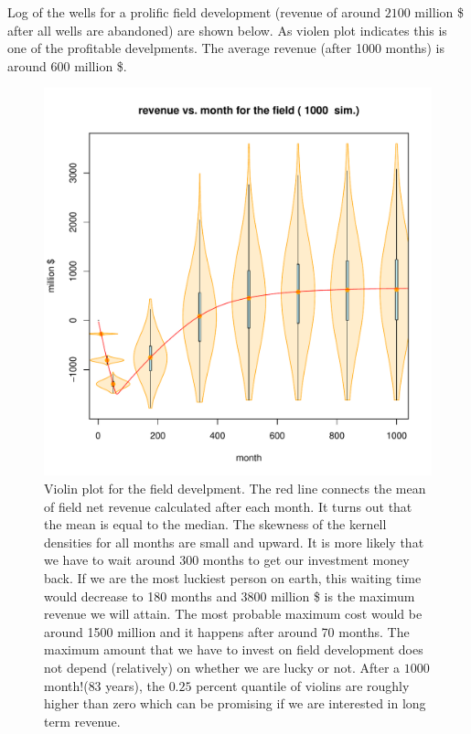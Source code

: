\documentclass[paper=a4, fontsize=12pt]{scrartcl}\usepackage{graphicx, color}
\numberwithin{equation}{section} %
\numberwithin{figure}{section} %
\numberwithin{table}{section} %
\begin{document}
Log of the wells for a prolific field development (revenue of around $2100$ million \$ after all wells are abandoned) are shown below. As violen plot indicates this is one of the profitable develpments. The average revenue (after 1000 months) is around 600 million \$. 

%

\pagebreak


\begin{figure}[htbp]
\begin{center}
\includegraphics[width=\linewidth]{vioplot.pdf}
\caption{Violin plot for the field develpment. The red line connects the mean of field net revenue calculated after each month. It turns out that the mean is equal to the median. The skewness of the kernell densities for all months are small and upward. It is more likely that we have to wait around 300 months to get our investment money back. If we are the most luckiest person on earth, this waiting time would decrease to 180 months and 3800 million \$ is the maximum revenue we will attain. The most probable maximum cost would be around 1500 million and it happens after around 70 months. The maximum amount that we have to invest on field development does not depend (relatively) on whether we are lucky or not. After a $1000$ month!($83$ years), the $0.25$ percent quantile of violins are roughly higher than zero which can be promising if we are interested in long term revenue. 
}
\label{simPlot}
\end{center}
\end{figure}


%
\end{document}
